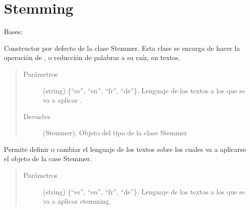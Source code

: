 \documentclass[letterpaper,10pt,openany,spanish]{sphinxmanual}
\begin{document}
\chapter{Stemming}
\label{\detokenize{funciones/stemming:module-stemming}}\label{\detokenize{funciones/stemming:stemming}}\label{\detokenize{funciones/stemming::doc}}

\begin{fulllineitems}
\label{\detokenize{funciones/stemming:stemming.Stemmer}}
Bases: 

Constructor por defecto de la clase Stemmer. Esta clase se encarga         de hacer la operación de , o reducción de palabras a su         raíz, en textos.
\begin{quote}\begin{description}
\item[{Parámetros}] \leavevmode
{} \textendash{} (string) \{“es”, “en”, “fr”, “de”\}. Lenguaje de los            textos a los que se va a aplicar .

\item[{Devuelve}] \leavevmode
(Stemmer). Objeto del tipo de la clase Stemmer

\end{description}\end{quote}

\begin{fulllineitems}
\label{\detokenize{funciones/stemming:stemming.Stemmer.establecer_lenguaje}}
Permite definir o cambiar el lenguaje de los textos sobre los cuales             va a aplicarse el objeto de la case Stemmer.
\begin{quote}\begin{description}
\item[{Parámetros}] \leavevmode
{} \textendash{} (string) \{“es”, “en”, “fr”, “de”\}. Lenguaje de los            textos a los que se va a aplicar stemming.


\end{description}
\end{quote}
\end{fulllineitems}
\end{fulllineitems}
\end{document}
